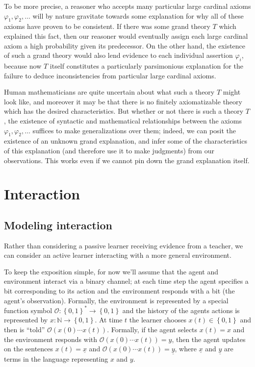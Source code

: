 \documentclass[12pt]{article}
\theoremstyle{definition}
\renewcommand{\O}{\mathcal{O}}
\newcommand{\Of}[1]{\O\of{#1}}
\newcommand{\of}[1]{\left(#1\right)}
\renewcommand{\b}[1]{\left\{#1\right\}}
\newcommand{\vp}{\varphi}
\begin{document}
To be more precise, a reasoner who accepts many particular large cardinal
axioms $\vp_1, \vp_2, \ldots$ will by nature gravitate towards some explanation
for why all of these axioms have proven to be consistent.
If there was some grand theory $T$ which explained this fact,
then our reasoner would eventually assign each large cardinal axiom
a high probability given its predecessor.
On the other hand, the existence of such a grand theory would also lend
evidence to each individual assertion $\vp_i$, because now $T$
itself constitutes a particularly parsimonious explanation for the failure
to deduce inconsistencies from particular large cardinal axioms.

Human mathematicians are quite uncertain about what such a theory $T$ might look like,
and moreover it may be that there is no finitely axiomatizable
theory which has the desired characteristics.
But whether or not there is such a theory $T$,
the existence of syntactic and mathematical relationships between the axioms
$\vp_1, \vp_2, \ldots$ suffices to make generalizations over them;
indeed, we can posit the existence of an unknown grand explanation,
and infer some of the characteristics of this explanation (and therefore use it to make judgments)
from our observations.
This works even if we cannot pin down the grand explanation itself.

\section{Interaction}\label{interaction}


\subsection{Modeling interaction}

Rather than considering a passive learner
receiving evidence from a teacher,
we can consider an active learner interacting
with a more general environment.

To keep the exposition simple, for now we'll assume
that the agent and environment interact
via a binary channel;
at each time step the agent specifies a bit corresponding to its action
and the environment responds with a bit (the agent's observation).
Formally,
the environment is represented by a special function symbol $\O : \b{0, 1}^* \rightarrow \b{0, 1}$
and the history of the agents actions is represented by $x : \mathbb{N} \rightarrow \b{0, 1}$.
At time $t$ the learner chooses $x(t) \in \b{0, 1}$
and then is ``told'' $\Of{x(0) \cdots x(t)}$.
Formally, if the agent selects $x(t) = x$ and the environment
responds with $\Of{x(0) \cdots x(t)} = y$,
then the agent updates on the sentences $x(t) = \underline{x}$
and $\Of{x(0) \cdots x(t)} = \underline{y}$,
where $\underline{x}$ and $\underline{y}$ are terms in the language
representing $x$ and $y$.
\end{document}

